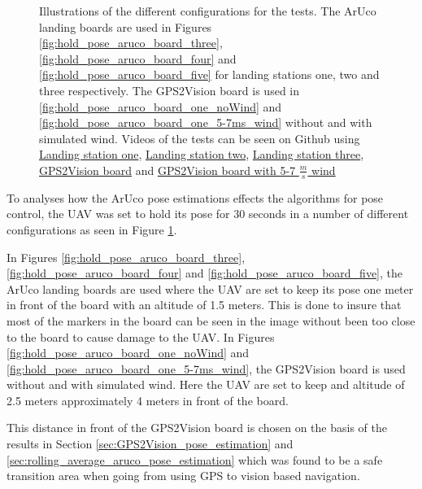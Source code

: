 \documentclass[../Head/report.tex]{subfiles}
\begin{document}
\begin{figure}[H]
    \caption{Illustrations of the different configurations for the tests. The ArUco landing boards are used in Figures \ref{fig:hold_pose_aruco_board_three}, \ref{fig:hold_pose_aruco_board_four} and \ref{fig:hold_pose_aruco_board_five} for landing stations one, two and three respectively. The GPS2Vision board is used in \ref{fig:hold_pose_aruco_board_one_noWind} and \ref{fig:hold_pose_aruco_board_one_5-7ms_wind} without and with simulated wind. Videos of the tests can be seen on Github using \href{https://github.com/Kenil16/master_project/tree/master/test_videos/analyse_hold_pose_using_aruco_pose_estimation_landing_station1}{Landing station one}, \href{https://github.com/Kenil16/master_project/tree/master/test_videos/analyse_hold_pose_using_aruco_pose_estimation_landing_station2}{Landing station two}, \href{https://github.com/Kenil16/master_project/tree/master/test_videos/analyse_hold_pose_using_aruco_pose_estimation_landing_station3}{Landing station three}, \href{https://github.com/Kenil16/master_project/tree/master/test_videos/analyse_hold_pose_using_aruco_pose_estimation_gps2vision_noWind}{GPS2Vision board} and  \href{https://github.com/Kenil16/master_project/tree/master/test_videos/analyse_hold_pose_using_aruco_pose_estimation_gps2vision_5-7ms_wind}{GPS2Vision board with 5-7 $\frac{m}{s}$ wind}}
    \label{fig:hold_pose_aruco_boards}
\end{figure}

To analyses how the ArUco pose estimations effects the algorithms for pose control, the UAV was set to hold its pose for 30 seconds in a number of different configurations as seen in Figure \ref{fig:hold_pose_aruco_boards}. 


In Figures \ref{fig:hold_pose_aruco_board_three}, \ref{fig:hold_pose_aruco_board_four} and \ref{fig:hold_pose_aruco_board_five}, the ArUco landing boards are used where the UAV are set to keep its pose one meter in front of the board with an altitude of 1.5 meters. This is done to insure that most of the markers in the board can be seen in the image without been too close to the board to cause damage to the UAV. In Figures \ref{fig:hold_pose_aruco_board_one_noWind} and \ref{fig:hold_pose_aruco_board_one_5-7ms_wind}, the GPS2Vision board is used without and with simulated wind. Here the UAV are set to keep and altitude of 2.5 meters approximately 4 meters in front of the board.

This distance in front of the GPS2Vision board is chosen on the basis of the results in Section \ref{sec:GPS2Vision_pose_estimation} and \ref{sec:rolling_average_aruco_pose_estimation} which was found to be a safe transition area when going from using GPS to vision based navigation.   
\end{document}

